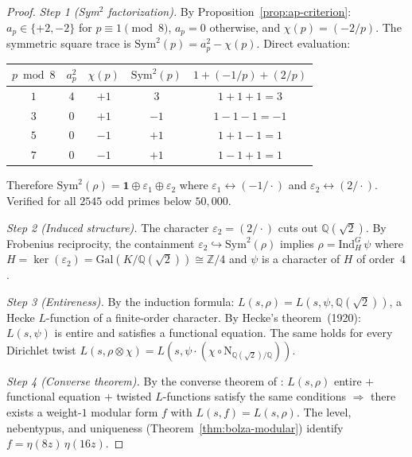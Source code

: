 \begin{proof}
\emph{Step 1 (Sym$^2$ factorization).}
By Proposition~\ref{prop:ap-criterion}:
$a_p \in \{+2, -2\}$ for $p \equiv 1 \pmod{8}$,
$a_p = 0$ otherwise, and $\chi(p) = (-2/p)$.
The symmetric square trace is
$\mathrm{Sym}^2(p) = a_p^2 - \chi(p)$.
Direct evaluation:
\begin{center}
\begin{tabular}{ccccc}
\toprule
$p \bmod 8$ & $a_p^2$ & $\chi(p)$ & $\mathrm{Sym}^2(p)$ &
  $1 + (-1/p) + (2/p)$ \\
\midrule
$1$ & $4$ & $+1$ & $3$ & $1{+}1{+}1 = 3$ \\
$3$ & $0$ & $+1$ & $-1$ & $1{-}1{-}1 = {-}1$ \\
$5$ & $0$ & $-1$ & $+1$ & $1{+}1{-}1 = 1$ \\
$7$ & $0$ & $-1$ & $+1$ & $1{-}1{+}1 = 1$ \\
\bottomrule
\end{tabular}
\end{center}
Therefore $\mathrm{Sym}^2(\rho)
= \mathbf{1} \oplus \varepsilon_1 \oplus \varepsilon_2$
where $\varepsilon_1 \leftrightarrow (-1/\cdot)$
and $\varepsilon_2 \leftrightarrow (2/\cdot)$.
Verified for all $2545$ odd primes below $50{,}000$.

\emph{Step 2 (Induced structure).}
The character $\varepsilon_2 = (2/\cdot)$ cuts out
$\mathbb{Q}(\sqrt{2})$.
By Frobenius reciprocity, the containment
$\varepsilon_2 \hookrightarrow \mathrm{Sym}^2(\rho)$
implies $\rho = \mathrm{Ind}_H^G\, \psi$
where $H = \ker(\varepsilon_2) =
\mathrm{Gal}(K/\mathbb{Q}(\sqrt{2})) \cong \mathbb{Z}/4$
and $\psi$ is a character of $H$ of order~$4$.

\emph{Step 3 (Entireness).}
By the induction formula:
$L(s,\rho) = L(s, \psi, \mathbb{Q}(\sqrt{2}))$,
a Hecke $L$-function of a finite-order character.
By Hecke's theorem~(1920): $L(s, \psi)$ is entire and
satisfies a functional equation.
The same holds for every Dirichlet twist
$L(s, \rho \otimes \chi) = L(s, \psi \cdot (\chi \circ
\mathrm{N}_{\mathbb{Q}(\sqrt{2})/\mathbb{Q}}))$.

\emph{Step 4 (Converse theorem).}
By the converse theorem of \citet{Weil1967}:
$L(s,\rho)$ entire $+$ functional equation $+$ twisted
$L$-functions satisfy the same conditions
$\Longrightarrow$ there exists a weight-$1$ modular form $f$
with $L(s,f) = L(s,\rho)$.
The level, nebentypus, and uniqueness
(Theorem~\ref{thm:bolza-modular}) identify
$f = \eta(8z)\,\eta(16z)$.
\end{proof}

